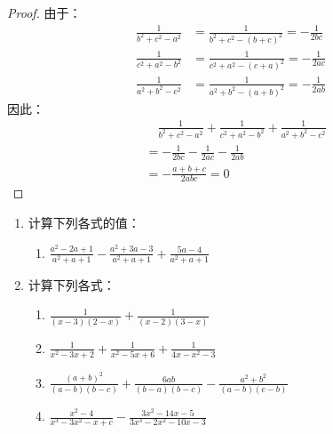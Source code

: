 \begin{proof}
由于：   
\[\begin{split}
    \frac{1}{b^2+c^2-a^2}&= \frac{1}{b^2+c^2-(b+c)^2}=-\frac{1}{2bc} \\
    \frac{1}{c^2+a^2-b^2}&= \frac{1}{c^2+a^2-(c+a)^2}=-\frac{1}{2ac}  \\
    \frac{1}{a^2+b^2-c^2}&=\frac{1}{a^2+b^2-(a+b)^2}=-\frac{1}{2ab}
\end{split}\]
因此：
\[\begin{split}
    &\quad \frac{1}{b^2+c^2-a^2}+\frac{1}{c^2+a^2-b^2}+\frac{1}{a^2+b^2-c^2}\\
    &=-\frac{1}{2bc}-\frac{1}{2ac}-\frac{1}{2ab}\\
&=-\frac{a+b+c}{2abc}=0
\end{split}\]
\end{proof}

\begin{ex}
\begin{enumerate}
    \item 计算下列各式的值：
  \begin{enumerate}
\item $\frac{a^{2}-2 a+1}{a^{2}+a+1}-\frac{a^{2}+3 a-3}{a^{2}+a+1}+\frac{5 a-4}{a^{2}+a+1}$
    
  \end{enumerate}

  \item 计算下列各式：
\begin{enumerate}
\item $\frac{1}{(x-3)(2-x)}+\frac{1}{(x-2)(3-x)}$
    \item  $\frac{1}{x^{2}-3 x+2}+\frac{1}{x^{2}-5 x+6}+\frac{1}{4 x-x^{2}-3}$
    \item  $\frac{(a+b)^{2}}{(a-b)(b-c)}+\frac{6 a b}{(b-a)(b-c)}-\frac{a^{2}+b^{2}}{(a-b)(c-b)}$
    \item  $\frac{x^{2}-4}{x^{3}-3 x^{2}-x+c}-\frac{3 x^{2}-14 x-5}{3 x^{3}-2 x^{2}-10 x-3}$
\end{enumerate}
\end{enumerate}  
\end{ex}

